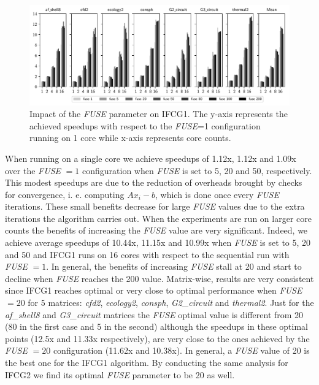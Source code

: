 \begin{figure}[bhtp]
        \centerline{\includegraphics[width=\textwidth, trim={0cm 0 0cm 0},clip]{ifcg/figs/mn3_fuse/cg_speedup_bar_nd.pdf}}
        \caption{Impact of the \emph{FUSE} parameter on IFCG1. The y-axis represents the achieved speedups with respect to the \emph{FUSE}=1 configuration running on 1 core while x-axis represents core counts.}
        \label{fuse}
\end{figure}

When running on a single core we achieve speedups of 1.12x, 1.12x and 1.09x over the \emph{FUSE} $=1$ configuration when \emph{FUSE} is set to 5, 20 and 50, respectively. 
This modest speedups are due to the reduction of overheads brought by checks for convergence, i. e. computing $Ax_i-b$, which is done once every \emph{FUSE} iterations. 
These small benefits decrease for large \emph{FUSE} values due to the extra iterations the algorithm carries out.  
When the experiments are run on larger core counts the benefits of increasing the \emph{FUSE} value are very significant.
Indeed, we achieve average speedups of 10.44x, 11.15x and 10.99x when \emph{FUSE} is set to 5, 20 and 50 and IFCG1 runs on 16 cores with respect to the sequential run with \emph{FUSE} $=1$.
In general, the benefits of increasing \emph{FUSE} stall at 20 and start to decline when \emph{FUSE} reaches the 200 value.
Matrix-wise, results are very consistent since IFCG1 reaches optimal or very close to optimal performance when \emph{FUSE} $=20$ for 5 matrices: \emph{cfd2}, \emph{ecology2}, \emph{consph}, \emph{G2\_circuit} and \emph{thermal2}. 
Just for the \emph{af\_shell8} and \emph{G3\_circuit} matrices the \emph{FUSE} optimal value is different from 20 (80 in the first case and 5 in the second) although the speedups in these optimal points (12.5x and 11.33x respectively), are very close to the ones achieved by the \emph{FUSE} $=20$ configuration (11.62x and 10.38x).
In general, a \emph{FUSE} value of 20 is the best one for the IFCG1 algorithm.
By conducting the same analysis for IFCG2 we find its optimal \emph{FUSE} parameter to be 20 as well. 

